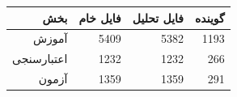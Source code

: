 \begin{center}
\begin{tabular}{rrrr}
\toprule
بخش & فایل خام & فایل تحلیل & گوینده \\
\midrule
آموزش & 5409 & 5382 & 1193 \\
اعتبارسنجی & 1232 & 1232 & 266 \\
آزمون & 1359 & 1359 & 291 \\
\bottomrule
\end{tabular}
\end{center}
